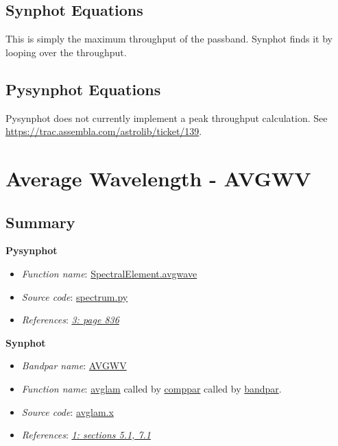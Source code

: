 \documentclass[letterpaper,10pt,english]{sphinxtsr}
\begin{document}
\section{Synphot Equations}
\label{main:id29}
This is simply the maximum throughput of the passband. Synphot finds it by
looping over the throughput.


\section{Pysynphot Equations}
\label{main:id30}
Pysynphot does not currently implement a peak throughput calculation.
See \href{https://trac.assembla.com/astrolib/ticket/139}{https://trac.assembla.com/astrolib/ticket/139}.


\chapter{Average Wavelength - AVGWV}
\label{main:average-wavelength-avgwv}

\section{Summary}
\label{main:id31}
\textbf{Pysynphot}
\begin{itemize}
\item {} 
\emph{Function name}: \href{https://trac.assembla.com/astrolib/browser/trunk/pysynphot/lib/pysynphot/spectrum.py\#L1039}{SpectralElement.avgwave}

\item {} 
\emph{Source code}: \href{https://trac.assembla.com/astrolib/browser/trunk/pysynphot/lib/pysynphot/spectrum.py}{spectrum.py}

\item {} 
\emph{References}: {\hyperref[references:ref3]{\emph{3: page 836}}}

\end{itemize}

\textbf{Synphot}
\begin{itemize}
\item {} 
\emph{Bandpar name}: \href{https://svn.stsci.edu/trac/ssb/stsci\_python/browser/stsdas/trunk/stsdas/pkg/hst\_calib/synphot/doc/bandpar.hlp}{AVGWV}

\item {} 
\emph{Function name}: \href{https://svn.stsci.edu/trac/ssb/stsci\_python/browser/stsdas/trunk/stsdas/lib/synphot/avglam.x}{avglam}
called by \href{https://svn.stsci.edu/trac/ssb/stsci\_python/browser/stsdas/trunk/stsdas/pkg/hst\_calib/synphot/bandpar/comppar.x}{comppar} called by \href{https://svn.stsci.edu/trac/ssb/stsci\_python/browser/stsdas/trunk/stsdas/pkg/hst\_calib/synphot/bandpar/bandpar.x}{bandpar}.

\item {} 
\emph{Source code}: \href{https://svn.stsci.edu/trac/ssb/stsci\_python/browser/stsdas/trunk/stsdas/lib/synphot/avglam.x}{avglam.x}

\item {} 
\emph{References}: {\hyperref[references:ref1]{\emph{1: sections 5.1, 7.1}}}

\end{itemize}
\end{document}
